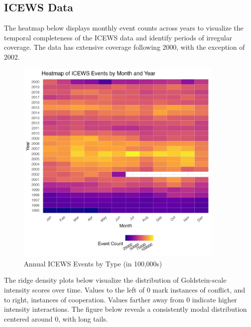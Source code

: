 \documentclass[12pt]{article}
\begin{document}
\subsection{ICEWS Data}
The heatmap below displays monthly event counts across years to visualize the temporal completeness of the ICEWS data and identify periods of irregular coverage. The data has extensive coverage following 2000, with the exception of 2002.

\begin{figure}[H]
\centering
\includegraphics[width=0.9\textwidth]{figures/icews_heatmap_monthly.png}
\caption{Annual ICEWS Events by Type (in 100,000s)}
\end{figure}

The ridge density plots below visualize the distribution of Goldstein-scale intensity scores over time. Values to the left of 0 mark instances of conflict, and to right, instances of cooperation. Values farther away from 0 indicate higher intensity interactions. The figure below reveals a consistently modal distribution centered around 0, with long tails. 
\end{document}
